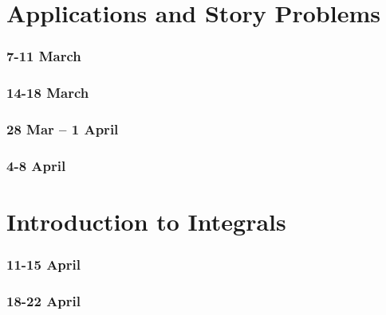 \documentclass[12pt]{beamer}
\theoremstyle{plain}
\theoremstyle{definition}
\begin{document}


\part{Applications and Story Problems}
\section[Week 8]{7-11 March}




\section[Week 9]{14-18 March}





\section[Week 10]{28 Mar -- 1 April}





\section[Week 11]{4-8 April}




\part{Introduction to Integrals}

\section[Week 12]{11-15 April}





\section[Week 13]{18-22 April}




\end{document}

